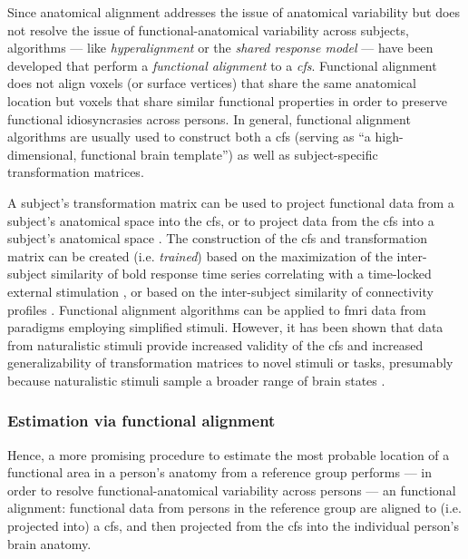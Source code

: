 Since anatomical alignment addresses the issue of anatomical variability but
does not resolve the issue of functional-anatomical variability across subjects,
algorithms --- like \textit{hyperalignment} \citep{haxby2011common,
guntupalli2016model} or the \textit{shared response model}
\citep{chen2015reduced, zhang2016searchlight} --- have been developed that
perform a \textit{functional alignment} to a \textit{\ac{cfs}}.
%
Functional alignment does not align voxels (or surface vertices) that share the
same anatomical location but voxels that share similar functional properties in
order to preserve functional idiosyncrasies across persons.
%
In general, functional alignment algorithms are usually used to construct both a
\ac{cfs} (serving as ``a high-dimensional, functional brain template'') as well
as subject-specific transformation matrices.

%
A subject's transformation matrix can be used to project functional data from a
subject's anatomical space into the \ac{cfs}, or to project data from the
\ac{cfs} into a subject's anatomical space \citep{haxby2020hyperalignment}.
%
The construction of the \ac{cfs} and transformation matrix can be created (i.e.
\textit{trained}) based on the maximization of the inter-subject similarity of
\ac{bold} response time series correlating with a time-locked external
stimulation \citep{haxby2011common, chen2015reduced, sabuncu2010function}, or
based on the inter-subject similarity of connectivity profiles
\citep{feilong2018reliable, guntupalli2018computational, nastase2019leveraging}.
%
Functional alignment algorithms can be applied to \ac{fmri} data from paradigms
employing simplified stimuli.
%
However, it has been shown that data from naturalistic stimuli provide increased
validity of the \ac{cfs} and increased generalizability of transformation
matrices to novel stimuli or tasks, presumably because naturalistic stimuli
sample a broader range of brain states \citep{haxby2011common,
guntupalli2016model}.


\subsubsection{Estimation via functional alignment}

%
Hence, a more promising procedure to estimate the most probable location of a
functional area in a person's anatomy from a reference group performs --- in
order to resolve functional-anatomical variability across persons --- an
functional alignment:
%
functional data from persons in the reference group are aligned to (i.e.
projected into) a \ac{cfs}, and then projected from the \ac{cfs} into the
individual person's brain anatomy.


